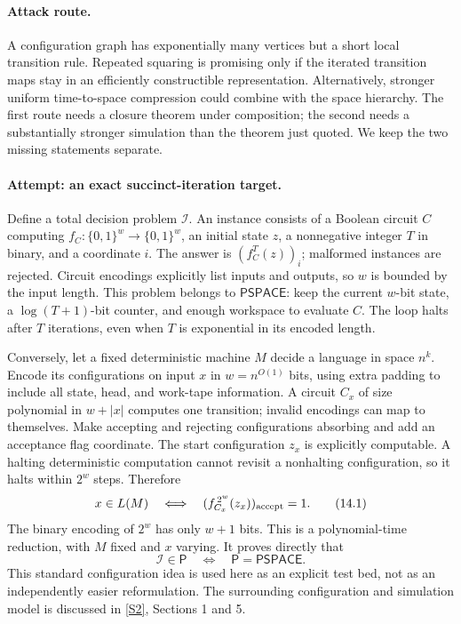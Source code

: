 \documentclass[11pt,a4paper]{article}
\newcommand{\sref}[2]{\hyperlink{source:#1:#2}{[S#2]}}
\begin{document}
\paragraph{Attack route.}
A configuration graph has exponentially many vertices but a short local
transition rule. Repeated squaring is promising only if the iterated
transition maps stay in an efficiently constructible representation.
Alternatively, stronger uniform time-to-space compression could combine
with the space hierarchy. The first route needs a closure theorem under
composition; the second needs a substantially stronger simulation than
the theorem just quoted. We keep the two missing statements separate.

\paragraph{Attempt: an exact succinct-iteration target.}
Define a total decision problem $\mathcal I$. An instance consists of a
Boolean circuit $C$ computing $f_C:\{0,1\}^w\to\{0,1\}^w$, an initial
state $z$, a nonnegative integer $T$ in binary, and a coordinate $i$.
The answer is $(f_C^T(z))_i$; malformed instances are rejected. Circuit
encodings explicitly list inputs and outputs, so $w$ is bounded by the
input length. This problem belongs to $\mathsf{PSPACE}$: keep the current
$w$-bit state, a $\log(T+1)$-bit counter, and enough workspace to evaluate
$C$. The loop halts after $T$ iterations, even when $T$ is exponential
in its encoded length.

Conversely, let a fixed deterministic machine $M$ decide a language in
space $n^k$. Encode its configurations on input $x$ in $w=n^{O(1)}$
bits, using extra padding to include all state, head, and work-tape
information. A circuit $C_x$ of size polynomial in $w+|x|$ computes one
transition; invalid encodings can map to themselves. Make accepting and
rejecting configurations absorbing and add an acceptance flag coordinate.
The start configuration $z_x$ is explicitly computable. A halting
deterministic computation cannot revisit a nonhalting configuration, so
it halts within $2^w$ steps. Therefore
\[
 x\in L(M)\quad\Longleftrightarrow\quad
 (f_{C_x}^{\,2^w}(z_x))_{\rm accept}=1. \tag{14.1}
\]
The binary encoding of $2^w$ has only $w+1$ bits. This is a polynomial-time
reduction, with $M$ fixed and $x$ varying. It proves directly that
\[
 \mathcal I\in\mathsf P\quad\Longleftrightarrow\quad
 \mathsf P=\mathsf{PSPACE}. \tag{14.2}
\]
This standard configuration idea is used here as an explicit test bed,
not as an independently easier reformulation. The surrounding
configuration and simulation model is discussed in \sref{3402}{2},
Sections 1 and 5.
\end{document}
